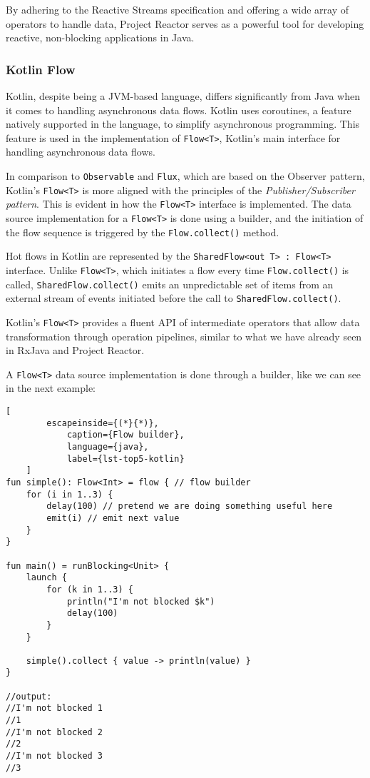 By adhering to the Reactive Streams specification and offering a wide array of operators to handle data, Project Reactor serves as a powerful tool for developing reactive, non-blocking applications in Java.

\subsubsection{Kotlin Flow}
\label{sec:kotlinflow}

Kotlin, despite being a JVM-based language, differs significantly from Java when it comes to handling asynchronous data flows. Kotlin uses coroutines, a feature natively supported in the language, to simplify asynchronous programming. This feature is used in the implementation of \texttt{Flow<T>}, Kotlin's main interface for handling asynchronous data flows.

In comparison to \texttt{Observable} and \texttt{Flux}, which are based on the Observer pattern, Kotlin's \texttt{Flow<T>} is more aligned with the principles of the \textit{Publisher/Subscriber pattern}. This is evident in how the \texttt{Flow<T>} interface is implemented. The data source implementation for a \texttt{Flow<T>} is done using a builder, and the initiation of the flow sequence is triggered by the \texttt{Flow.collect()} method.

Hot flows in Kotlin are represented by the \texttt{SharedFlow<out T> : Flow<T>} interface. Unlike \texttt{Flow<T>}, which initiates a flow every time \texttt{Flow.collect()} is called, \texttt{SharedFlow.collect()} emits an unpredictable set of items from an external stream of events initiated before the call to \texttt{SharedFlow.collect()}. 

Kotlin's \texttt{Flow<T>} provides a fluent API of intermediate operators that allow data transformation through operation pipelines, similar to what we have already seen in RxJava and Project Reactor. 

A \texttt{Flow<T>} data source implementation is done through a builder, like we can see in the next example:

\begin{center}
	\lstset{basicstyle=\scriptsize\ttfamily,frame=bottomline}
	\begin{lstlisting}[
		escapeinside={(*}{*)},
			caption={Flow builder},
			language={java},
			label={lst-top5-kotlin}
	]
fun simple(): Flow<Int> = flow { // flow builder
	for (i in 1..3) {
		delay(100) // pretend we are doing something useful here
		emit(i) // emit next value
	}
}

fun main() = runBlocking<Unit> {
	launch {
		for (k in 1..3) {
			println("I'm not blocked $k")
			delay(100)
		}
	}

	simple().collect { value -> println(value) } 
}

//output:
//I'm not blocked 1
//1
//I'm not blocked 2
//2
//I'm not blocked 3
//3
	
	\end{lstlisting}
\end{center}



